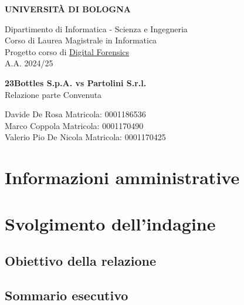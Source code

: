 \documentclass[a4paper,12pt]{report}
\begin{document}
\begin{titlepage}
    \centering
    \vspace*{0.1cm}

    \Huge
    \textbf{UNIVERSITÀ DI BOLOGNA}

    \vspace{1cm}
    \Large
    Dipartimento di Informatica - Scienza e Ingegneria \\
    Corso di Laurea Magistrale in Informatica \\\vspace{1cm}
    Progetto corso di \href{https://www.unibo.it/it/studiare/dottorati-master-specializzazioni-e-altra-formazione/insegnamenti/insegnamento/2024/479039}{Digital Forensics} \\
    A.A. 2024/25

    \vspace{5.5cm}
    \textbf{\LARGE 23Bottles S.p.A. vs Partolini S.r.l.}\\\vspace{0.3cm}
    \Large Relazione parte Convenuta

    \vfill

    \vfill

    \large
    Davide De Rosa \hfill Matricola: 0001186536\\
    Marco Coppola \hfill Matricola: 0001170490\\
    Valerio Pio De Nicola \hfill Matricola: 0001170425\\
\end{titlepage}

\tableofcontents
\newpage

\chapter{Informazioni amministrative}


\pagebreak

\chapter{Svolgimento dell'indagine}


\section{Obiettivo della relazione}


\pagebreak

\section{Sommario esecutivo}

\end{document}
